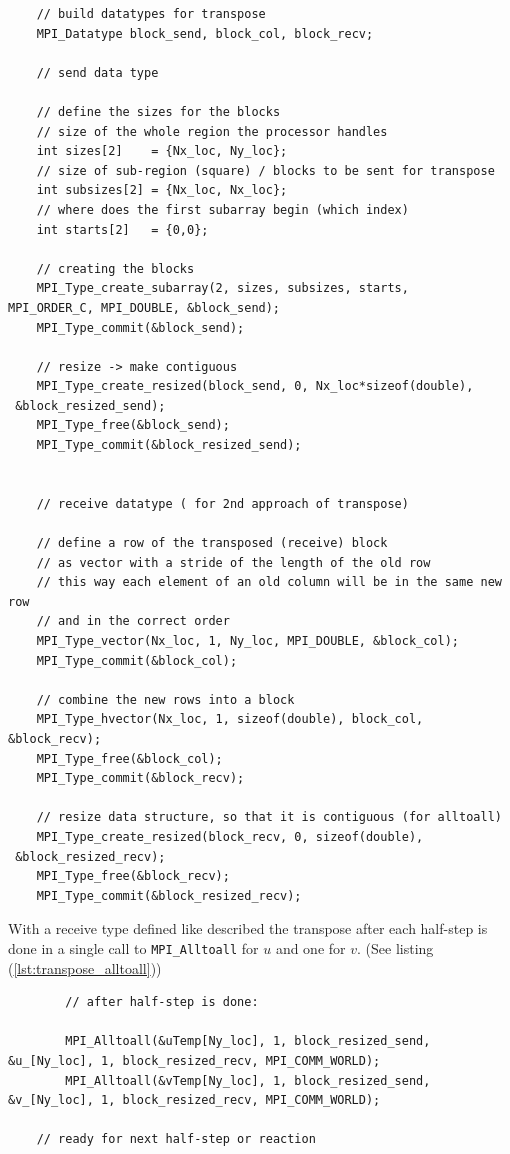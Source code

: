 \documentclass[11pt,a4paper]{article} %
\begin{document}
\begin{center}
\begin{verbatim}
    // build datatypes for transpose
    MPI_Datatype block_send, block_col, block_recv;
    
    // send data type

    // define the sizes for the blocks
    // size of the whole region the processor handles
    int sizes[2]    = {Nx_loc, Ny_loc};
    // size of sub-region (square) / blocks to be sent for transpose
    int subsizes[2] = {Nx_loc, Nx_loc}; 
    // where does the first subarray begin (which index)
    int starts[2]   = {0,0};            
    
    // creating the blocks
    MPI_Type_create_subarray(2, sizes, subsizes, starts, 
MPI_ORDER_C, MPI_DOUBLE, &block_send);
    MPI_Type_commit(&block_send);

    // resize -> make contiguous
    MPI_Type_create_resized(block_send, 0, Nx_loc*sizeof(double),
 &block_resized_send);
    MPI_Type_free(&block_send);
    MPI_Type_commit(&block_resized_send);
    
    
    // receive datatype ( for 2nd approach of transpose)

    // define a row of the transposed (receive) block 
    // as vector with a stride of the length of the old row
    // this way each element of an old column will be in the same new row 
    // and in the correct order
    MPI_Type_vector(Nx_loc, 1, Ny_loc, MPI_DOUBLE, &block_col);
    MPI_Type_commit(&block_col);

    // combine the new rows into a block
    MPI_Type_hvector(Nx_loc, 1, sizeof(double), block_col, &block_recv);
    MPI_Type_free(&block_col);
    MPI_Type_commit(&block_recv);

    // resize data structure, so that it is contiguous (for alltoall)
    MPI_Type_create_resized(block_recv, 0, sizeof(double),
 &block_resized_recv);
    MPI_Type_free(&block_recv);
    MPI_Type_commit(&block_resized_recv);

\end{verbatim}
\end{center}

With a receive type defined like described the transpose after each half-step is done in a single call to \texttt{MPI\_Alltoall} for $u$ and one for $v$. (See listing (\ref{lst:transpose_alltoall}))

\begin{center}
\begin{verbatim}
        // after half-step is done:

        MPI_Alltoall(&uTemp[Ny_loc], 1, block_resized_send, 
&u_[Ny_loc], 1, block_resized_recv, MPI_COMM_WORLD);
        MPI_Alltoall(&vTemp[Ny_loc], 1, block_resized_send, 
&v_[Ny_loc], 1, block_resized_recv, MPI_COMM_WORLD);
	
	// ready for next half-step or reaction
\end{verbatim}
\end{center}
\end{document}
